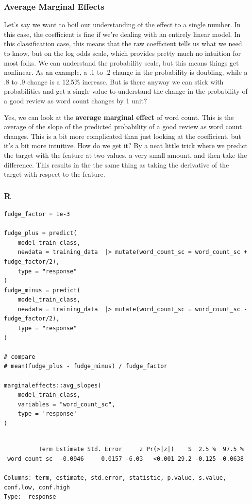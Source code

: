 \documentclass[
  letterpaper,
]{krantz}
\begin{document}
\subsubsection{Average Marginal Effects}\label{average-marginal-effects}

Let's say we want to boil our understanding of the effect to a single
number. In this case, the coefficient is fine if we're dealing with an
entirely linear model. In this classification case, this means that the
raw coefficient tells us what we need to know, but on the log odds
scale, which provides pretty much no intuition for most folks. We can
understand the probability scale, but this means things get nonlinear.
As an example, a .1 to .2 change in the probability is doubling, while a
.8 to .9 change is a 12.5\% increase. But is there anyway we can stick
with probabilities and get a single value to understand the change in
the probability of a good review as word count changes by 1 unit?

Yes, we can look at the \textbf{average marginal effect} of word count.
This is the average of the slope of the predicted probability of a good
review as word count changes. This is a bit more complicated than just
looking at the coefficient, but it's a bit more intuitive. How do we get
it? By a neat little trick where we predict the target with the feature
at two values, a very small amount, and then take the difference. This
results in the the same thing as taking the derivative of the target
with respect to the feature.

\subsubsection{R}

\begin{verbatim}
fudge_factor = 1e-3

fudge_plus = predict(
    model_train_class, 
    newdata = training_data  |> mutate(word_count_sc = word_count_sc + fudge_factor/2),
    type = "response"
)
fudge_minus = predict(
    model_train_class, 
    newdata = training_data  |> mutate(word_count_sc = word_count_sc - fudge_factor/2),
    type = "response"
)

# compare
# mean(fudge_plus - fudge_minus) / fudge_factor

marginaleffects::avg_slopes(
    model_train_class, 
    variables = "word_count_sc", 
    type = 'response'
)
\end{verbatim}

\begin{verbatim}

          Term Estimate Std. Error     z Pr(>|z|)    S  2.5 %  97.5 %
 word_count_sc  -0.0946     0.0157 -6.03   <0.001 29.2 -0.125 -0.0638

Columns: term, estimate, std.error, statistic, p.value, s.value, conf.low, conf.high 
Type:  response 
\end{verbatim}
\end{document}
